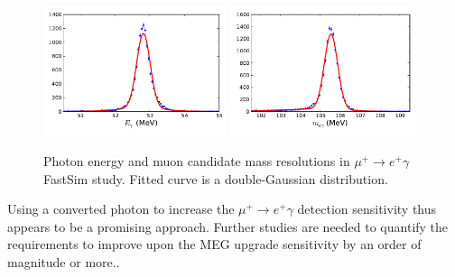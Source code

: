\begin{figure}[htbp]
   \centering
   \includegraphics[width=0.48\textwidth]{ChargedLeptons/Figures/muegamma-gamma-resolution.pdf} 
   \includegraphics[width=0.48\textwidth]{ChargedLeptons/Figures/muegamma-mumass-resolution.pdf} 
   \caption{Photon energy and muon candidate mass resolutions in 
   $\mu^+\to e^+\gamma$ FastSim study. Fitted curve is a double-Gaussian 
   distribution.}
   \label{fig:muegamma-resolutions}
\end{figure}

Using a converted photon to increase the $\mu^+\to e^+\gamma$ detection sensitivity
thus appears to be a promising approach. Further studies are needed to quantify the requirements to improve upon the MEG upgrade sensitivity by an order of magnitude or more.. 




